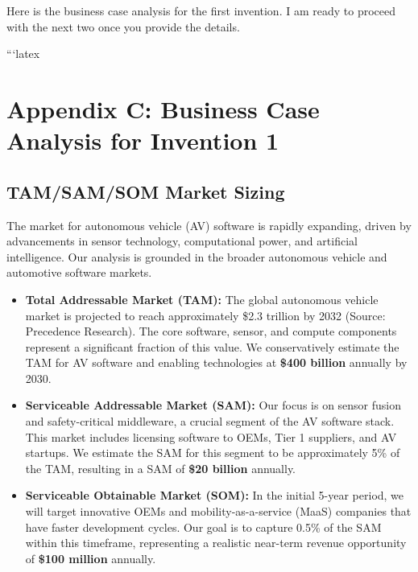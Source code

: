 \documentclass{article}
\begin{document}
Here is the business case analysis for the first invention. I am ready to proceed with the next two once you provide the details.

```latex
\section{Appendix C: Business Case Analysis for Invention 1}

\subsection{TAM/SAM/SOM Market Sizing}
The market for autonomous vehicle (AV) software is rapidly expanding, driven by advancements in sensor technology, computational power, and artificial intelligence. Our analysis is grounded in the broader autonomous vehicle and automotive software markets.

\begin{itemize}
    \item \textbf{Total Addressable Market (TAM):} The global autonomous vehicle market is projected to reach approximately \$2.3 trillion by 2032 (Source: Precedence Research). The core software, sensor, and compute components represent a significant fraction of this value. We conservatively estimate the TAM for AV software and enabling technologies at \textbf{\$400 billion} annually by 2030.

    \item \textbf{Serviceable Addressable Market (SAM):} Our focus is on sensor fusion and safety-critical middleware, a crucial segment of the AV software stack. This market includes licensing software to OEMs, Tier 1 suppliers, and AV startups. We estimate the SAM for this segment to be approximately 5\% of the TAM, resulting in a SAM of \textbf{\$20 billion} annually.

    \item \textbf{Serviceable Obtainable Market (SOM):} In the initial 5-year period, we will target innovative OEMs and mobility-as-a-service (MaaS) companies that have faster development cycles. Our goal is to capture 0.5\% of the SAM within this timeframe, representing a realistic near-term revenue opportunity of \textbf{\$100 million} annually.
\end{itemize}
\end{document}
